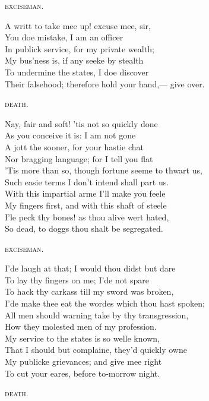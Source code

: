 \begin{dcverse}\footnotesize
\vin\vin\vin\vin \textsc{exciseman}.

A writt to take mee up! excuse mee, sir,\\
You doe mistake, I am an officer\\
In publick service, for my private wealth;\\
My bus’ness is, if any seeke by stealth\\
To undermine the states, I doe discover\\
Their falsehood; therefore hold your hand,— give over.

\vin\vin\vin\vin \textsc{death}.

Nay, fair and soft! ’tis not so quickly done\\
As you conceive it is: I am not gone\\
A jott the sooner, for your hastie chat\\
Nor bragging language; for I tell you flat\\
’Tis more than so, though fortune seeme to thwart us,\\
Such easie terms I don’t intend shall part us.\\
With this impartial arme I’ll make you feele\\
My fingers first, and with this shaft of steele\\
I’le peck thy bones! as thou alive wert hated,\\
So dead, to doggs thou shalt be segregated.

\vin\vin\vin\vin \textsc{exciseman}.

I’de laugh at that; I would thou didst but dare\\
To lay thy fingers on me; I’de not spare\\
To hack thy carkass till my sword was broken,\\
I’de make thee eat the wordes which thou hast spoken;\\
All men should warning take by thy transgression,\\
How they molested men of my profession.\\
My service to the states is so welle known,\\
That I should but complaine, they’d quickly owne\\
My publicke grievances; and give mee right\\
To cut your eares, before to-morrow night.

\vin\vin\vin\vin \textsc{death}.


\end{dcverse}
